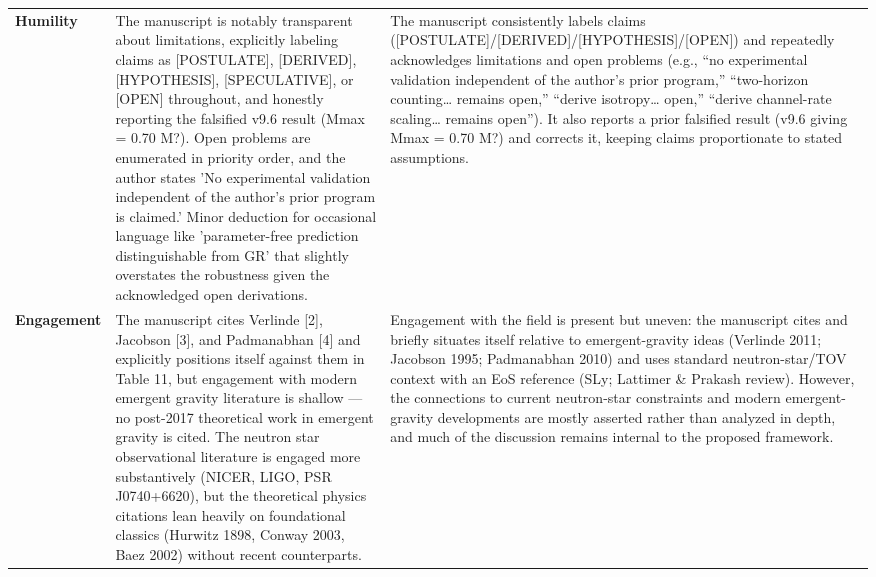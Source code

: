 \documentclass[11pt]{article}
\begin{document}
\begin{longtable}{@{} p{2.2cm} p{6.3cm} p{6.3cm} @{}}
\rowcolor{rowgray}
\textbf{Humility} &
The manuscript is notably transparent about limitations, explicitly labeling claims as [POSTULATE], [DERIVED], [HYPOTHESIS], [SPECULATIVE], or [OPEN] throughout, and honestly reporting the falsified v9.6 result (Mmax = 0.70 M?). Open problems are enumerated in priority order, and the author states 'No experimental validation independent of the author's prior program is claimed.' Minor deduction for occasional language like 'parameter-free prediction distinguishable from GR' that slightly overstates the robustness given the acknowledged open derivations. &
The manuscript consistently labels claims ([POSTULATE]/[DERIVED]/[HYPOTHESIS]/[OPEN]) and repeatedly acknowledges limitations and open problems (e.g., ``no experimental validation independent of the author's prior program,'' ``two-horizon counting\ldots{} remains open,'' ``derive isotropy\ldots{} open,'' ``derive channel-rate scaling\ldots{} remains open''). It also reports a prior falsified result (v9.6 giving Mmax = 0.70 M?) and corrects it, keeping claims proportionate to stated assumptions. \\[6pt]

\textbf{Engagement} &
The manuscript cites Verlinde [2], Jacobson [3], and Padmanabhan [4] and explicitly positions itself against them in Table 11, but engagement with modern emergent gravity literature is shallow --- no post-2017 theoretical work in emergent gravity is cited. The neutron star observational literature is engaged more substantively (NICER, LIGO, PSR J0740+6620), but the theoretical physics citations lean heavily on foundational classics (Hurwitz 1898, Conway 2003, Baez 2002) without recent counterparts. &
Engagement with the field is present but uneven: the manuscript cites and briefly situates itself relative to emergent-gravity ideas (Verlinde 2011; Jacobson 1995; Padmanabhan 2010) and uses standard neutron-star/TOV context with an EoS reference (SLy; Lattimer \& Prakash review). However, the connections to current neutron-star constraints and modern emergent-gravity developments are mostly asserted rather than analyzed in depth, and much of the discussion remains internal to the proposed framework. \\[6pt]


\end{longtable}
\end{document}
